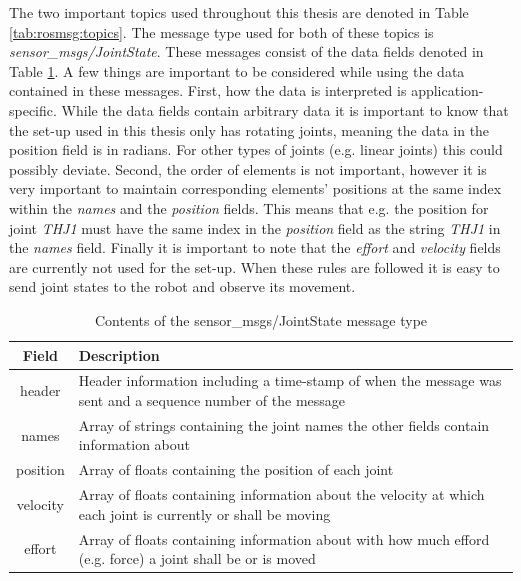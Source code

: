 The two important topics used throughout this thesis are denoted in Table \ref{tab:rosmsg:topics}. The message type used for both of these topics is \textit{sensor\_msgs/JointState}. These messages consist of the data fields denoted in Table \ref{tab:rosmsg:contents}. A few things are important to be considered while using the data contained in these messages. First, how the data is interpreted is application-specific. While the data fields contain arbitrary data it is important to know that the set-up used in this thesis only has rotating joints, meaning the data in the position field is in radians. For other types of joints (e.g. linear joints) this could possibly deviate. Second, the order of elements is not important, however it is very important to maintain corresponding elements' positions at the same index within the \textit{names} and the \textit{position} fields. This means that e.g. the position for joint \textit{THJ1} must have the same index in the \textit{position} field as the string \textit{THJ1} in the \textit{names} field. Finally it is important to note that the \textit{effort} and \textit{velocity} fields are currently not used for the set-up. When these rules are followed it is easy to send joint states to the robot and observe its movement.

\begin{table}
	\caption{\label{tab:rosmsg:contents}Contents of the  \mbox{sensor\_msgs/JointState} message type}
	
	\begin{tabularx}{\linewidth}{|c|X|}
		\hline
		\textbf{Field} & \textbf{Description} \\
		\hline
		header & Header information including a time-stamp of when the message was sent and a sequence number of the message \\
		\hline
		names & Array of strings containing the joint names the other fields contain information about \\
		\hline
		position & Array of floats containing the position of each joint \\
		\hline
		velocity & Array of floats containing information about the velocity at which each joint is currently or shall be moving \\
		\hline
		effort & Array of floats containing information about with how much efford (e.g. force) a joint shall be or is moved \\
		\hline
	\end{tabularx}
\end{table}

